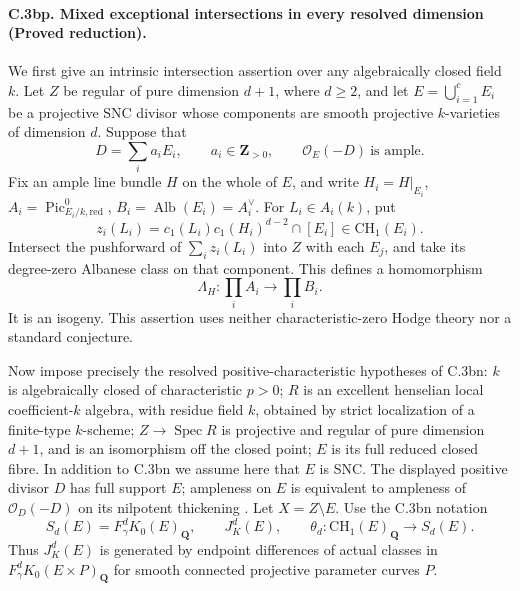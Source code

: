 \paragraph{C.3bp. Mixed exceptional intersections in every resolved dimension
(Proved reduction).}
We first give an intrinsic intersection assertion over any
algebraically closed field $k$.
Let $Z$ be regular of pure dimension $d+1$, where $d\ge2$, and let
$E=\bigcup_{i=1}^cE_i$ be a projective SNC divisor whose components
are smooth projective $k$-varieties of dimension $d$.
Suppose that
\[
 D=\sum_i a_iE_i,\qquad a_i\in\mathbf Z_{>0},\qquad
                         \mathcal O_E(-D)\ \text{is ample}.
\]
Fix an ample line bundle $H$ on the whole of $E$, and write
$H_i=H|_{E_i}$,
$A_i=\operatorname{Pic}^0_{E_i/k,\mathrm{red}}$,
$B_i=\operatorname{Alb}(E_i)=A_i^\vee$.
For $L_i\in A_i(k)$, put
\[
 z_i(L_i)=c_1(L_i)c_1(H_i)^{d-2}\cap[E_i]
                              \in\mathrm{CH}_1(E_i).
\]
Intersect the pushforward of $\sum_i z_i(L_i)$ into $Z$ with each
$E_j$, and take its degree-zero Albanese class on that component.
This defines a homomorphism
\begin{equation}
       \Lambda_H:\prod_iA_i\longrightarrow\prod_iB_i.
                                                        \tag{MA.1}
\end{equation}
It is an isogeny. This assertion uses neither characteristic-zero
Hodge theory nor a standard conjecture.

Now impose precisely the resolved positive-characteristic
hypotheses of C.3bn: $k$ is algebraically closed of characteristic
$p>0$; $R$ is an excellent henselian local coefficient-$k$ algebra,
with residue field $k$, obtained by strict localization of a
finite-type $k$-scheme; $Z\to\operatorname{Spec}R$ is projective
and regular of pure dimension $d+1$, and is an isomorphism off
the closed point; $E$ is its full reduced closed fibre.
In addition to C.3bn we assume here that $E$ is SNC.
The displayed positive divisor $D$ has full support $E$;
ampleness on $E$ is equivalent to ampleness of
$\mathcal O_D(-D)$ on its nilpotent thickening
\citep[Lemma 30.17.5]{rootStacks2026NilpotentAmple}.
Let $X=Z\setminus E$. Use the C.3bn notation
\[
 S_d(E)=F_\gamma^dK_0(E)_{\mathbf Q},\qquad J_K^d(E),\qquad
 \theta_d:\mathrm{CH}_1(E)_{\mathbf Q}\longrightarrow S_d(E).
\]
Thus $J_K^d(E)$ is generated by endpoint differences of actual
classes in $F_\gamma^dK_0(E\times P)_{\mathbf Q}$ for smooth
connected projective parameter curves $P$.

